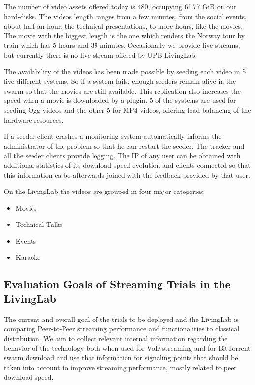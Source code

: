 The number of video assets offered today is 480, occupying 61.77 GiB on our
hard-disks. The videos length ranges from a few minutes, from the social
events, about half an hour, the technical presentations, to more hours, like
the movies. The movie with the biggest length is the one which renders the
Norway tour by train which has 5 hours and 39 minutes. Occasionally we provide
live streams, but currently there is no live stream offered by UPB LivingLab.

The availability of the videos has been made possible by seeding each video in
5 five different systems. So if a system fails, enough seeders remain alive in
the swarm so that the movies are still available. This replication also
increases the speed when a movie is downloaded by a plugin. 5 of the systems
are used for seeding Ogg videos and the other 5 for MP4 videos, offering load
balancing of the hardware resources.

If a seeder client crashes a monitoring system automatically informs the
administrator of the problem so that he can restart the seeder. The tracker
and all the seeder clients provide logging. The IP of any user can be obtained
with additional statistics of its download speed evolution and clients
connected so that this information ca be afterwards joined with the feedback
provided by that user.

On the LivingLab the videos are grouped in four major categories:
\begin{itemize}
  \item Movies
  \item Technical Talks
  \item Events
  \item Karaoke
\end{itemize}

\subsection{Evaluation Goals of Streaming Trials in the LivingLab}
\label{subsec:multimedia-dist:evaluation-goals}

The current and overall goal of the trials to be deployed and the LivingLab is
comparing Peer-to-Peer streaming performance and functionalities to
classical distribution. We aim to collect relevant internal information
regarding the behavior of the technology both when used for VoD streaming and
for BitTorrent swarm download and use that information for signaling points
that should be taken into account to improve streaming performance, mostly
related to peer download speed.

